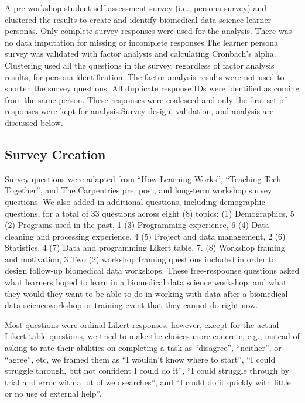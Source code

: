 \documentclass[020-persona\_validation.tex]{subfiles}
\begin{document}
  A pre-workshop student self-assessment survey (i.e., persona survey)
    and clustered the results to create and identify  biomedical data science learner personas.
    Only complete survey responses were used for the analysis. There was no data imputation for missing or incomplete responses.The learner persona survey was validated with factor analysis and calculating Cronbach's alpha.
    Clustering used all the questions in the survey,
    regardless of factor analysis results,
    for persona identification.
    The factor analysis results were not used to shorten the survey questions.
    All duplicate response IDs were identified as coming from the same person.
    These responses were coalesced and only the first set of responses were kept for analysis.Survey design, validation, and analysis are discussed below. 

    \subsection{Survey Creation}

        Survey questions were adapted from
        ``How Learning Works'',
        ``Teaching Tech Together'', and
        The Carpentries pre, post, and long-term workshop survey questions. %
        We also added in additional questions, including demographic questions,
        for a total of 33 questions across eight (8) topics:
        (1) Demographics, 5
        (2) Programs used in the past, 1
        (3) Programming experience, 6
        (4) Data cleaning and processing experience, 4
        (5) Project and data management, 2
        (6) Statistics, 4
        (7) Data and programming Likert table, 7.
        (8) Workshop framing and motivation, 3
        Two (2) workshop framing questions included in order to design follow-up biomedical data workshops. These free-respoonse questions asked 
        what learners hoped to learn in a biomedical data science workshop,
        and what they would they want to be able to do in working with data after a biomedical data scienceworkshop or training event that they cannot do right now.

        Most questions were ordinal Likert responses, however,
        except for the actual Likert table questions,
        we tried to make the choices more concrete,
        e.g., instead of asking to rate their abilities on completing a task as
        ``disagree'', ``neither'', or ``agree'', etc,
        we framed them as ``I wouldn't know where to start'',
        ``I could struggle through, but not confident I could do it'',
        ``I could struggle through by trial and error with a lot of web searches'',
        and
        ``I could do it quickly with little or no use of external help''.
\end{document}
